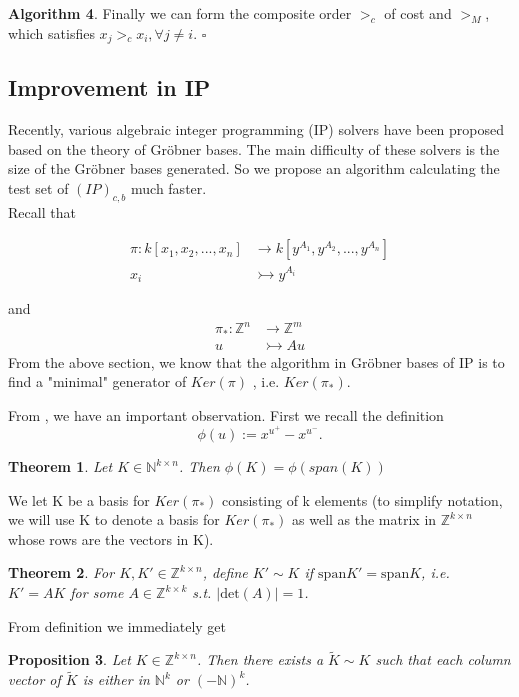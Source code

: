 \documentclass{article}
\theoremstyle{plain}
\newtheorem{theorem}{Theorem}[section]
\newtheorem{proposition}[theorem]{Proposition}
\theoremstyle{definition}
\newtheorem{algorithm}[theorem]{Algorithm}
\begin{document}
\begin{algorithm}
Finally we can form the composite order $>_c$ of cost and $>_M$, which satisfies $x_j >_{c} x_i,\forall j\neq i$. \hfill $\square$

\subsection{Improvement in IP }
Recently, various algebraic integer programming (IP) solvers have been proposed based on the theory of Gröbner bases. The main difficulty of these solvers is the size of the Gröbner bases generated. So we propose an algorithm calculating the test set of $(IP)_{c,b}$ much faster.\\

Recall that 

\begin{align*}
\pi:  k[x_1,x_2,...,x_n] & \to k[y^{A_1},y^{A_2},...,y^{A_n}] \\
 x_{i} & \rightarrowtail y^{A_i}
\end{align*}

and
\begin{align*}
 \pi_*:  \mathbb{Z}^{n} & \to\mathbb{Z}^{m} \\
 u & \rightarrowtail  Au
\end{align*}
From the above section, we know that the algorithm in Gröbner bases of IP is to find a "minimal" generator of $Ker(\pi)$ , i.e. $Ker(\pi_*)$.

From \cite{ref6}, we have an important observation. First we recall the definition
$$\phi(u):=x^{u^+}-x^{u^-}.$$

\begin{theorem}Let $K \in \mathbb{N}^{k\times n}$. Then $\phi(K)=\phi(span(K))$\end{theorem}

We let K be a basis for $Ker(\pi_*)$ consisting of k elements (to simplify notation, we will use K to denote a basis for $Ker(\pi_*)$ as well as the matrix in $\mathbb{Z}^{k\times n}$ whose rows are the vectors in K). 

\begin{theorem}For $K,K'\in \mathbb{Z}^{k\times n}$, define $K'\sim K$ if $\text{span} K' = \text{span} K$, i.e. $K' = AK$ for some $A\in \mathbb{Z}^{k\times k}$ s.t. $|\text{det}(A)|=1$. \end{theorem}

From definition we immediately get 

\begin{proposition}Let $K\in \mathbb{Z}^{k\times n}$. Then there exists a $\tilde{K}\sim K$ such that each column vector of $\tilde{K}$ is either in $\mathbb{N}^k$ or $(-\mathbb{N})^k$. \end{proposition}


\end{algorithm}
\end{document}
